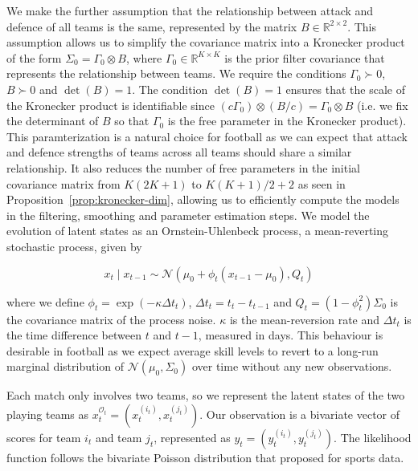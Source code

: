We make the further assumption that the relationship between attack and defence of all teams is the same, represented by the matrix $B \in \mathbb{R}^{2 \times 2}$. This assumption allows us to simplify the covariance matrix into a Kronecker product of the form $\Sigma_0 = \Gamma_0 \otimes B$, where $\Gamma_0 \in \mathbb{R}^{K \times K}$ is the prior filter covariance that represents the relationship between teams. We require the conditions $\Gamma_0 \succ 0$, $B \succ 0$ and $\det(B) = 1$. The condition $\det(B) = 1$ ensures that the scale of the Kronecker product is identifiable since $(c\Gamma_0) \otimes (B/c) = \Gamma_0 \otimes B$ (i.e. we fix the determinant of $B$ so that $\Gamma_0$ is the free parameter in the Kronecker product). This paramterization is a natural choice for football as we can expect that attack and defence strengths of teams across all teams should share a similar relationship. It also reduces the number of free parameters in the initial covariance matrix from $K(2K+1)$ to $K(K+1)/2 + 2$ as seen in Proposition~\ref{prop:kronecker-dim}, allowing us to efficiently compute the models in the filtering, smoothing and parameter estimation steps. We model the evolution of latent states as an Ornstein-Uhlenbeck process, a mean-reverting stochastic process, given by

\begin{equation}
    x_t \mid x_{t-1} \sim \mathcal{N}(\mu_0 + \phi_t (x_{t-1} - \mu_0), Q_t)
\end{equation}

where we define $\phi_t = \exp(-\kappa \Delta t_t)$, $\Delta t_t = t_t - t_{t-1}$ and $Q_t = (1 - \phi_t^2)\Sigma_0$ is the covariance matrix of the process noise. $\kappa$ is the mean-reversion rate and $\Delta t_t$ is the time difference between $t$ and $t-1$, measured in days. This behaviour is desirable in football as we expect average skill levels to revert to a long-run marginal distribution of $\mathcal{N}(\mu_0, \Sigma_0)$ over time without any new observations.


Each match only involves two teams, so we represent the latent states of the two playing teams as $x_t^{\mathcal{O}_t} = (x_t^{(i_t)}, x_t^{(j_t)})$. Our observation is a bivariate vector of scores for team $i_t$ and team $j_t$, represented as $y_t = (y_t^{(i_t)}, y_t^{(j_t)})$. The likelihood function follows the bivariate Poisson distribution that \citet{karlisntzoufras2003bivariatepoisson} proposed for sports data.

